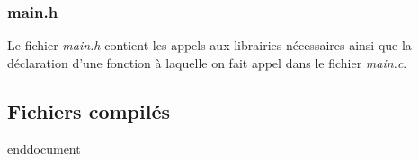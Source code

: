 \documentclass[11pt,french]{article}
\begin{document}
            \subsubsection{main.h} %
            \label{ssub:main.h}
                Le fichier \emph{main.h} contient les appels aux librairies nécessaires ainsi que la déclaration
                d'une fonction à laquelle on fait appel dans le fichier \emph{main.c}.
        \subsection{Fichiers compilés} %
        \label{sub:fich-compiles-inf1009-tp}
        

end{document}
\end{document}
